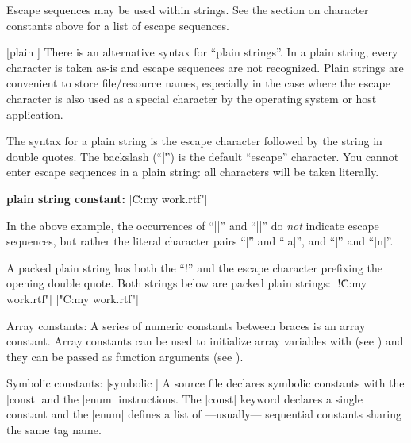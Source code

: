         Escape sequences may be used within strings. See the section on
        character constants above for a list of escape sequences.

         [plain \midtilde]
        There is an alternative syntax for ``plain strings''. In a plain string,
        every character is taken as-is and escape sequences are not recognized.
        Plain strings are convenient to store file\slash resource names, especially
        in the case where the escape character is also used as a special character
        by the operating system or host application.

        The syntax for a plain string is the escape character followed by the
        string in double quotes. The backslash (``|\|'') is the default
        ``escape'' character. You cannot enter escape sequences in a plain string:
        all characters will be taken literally.

        {\bf plain string constant:} \lbreak
        \tabto 20pt |\"C:\all my work\novel.rtf"|

        In the above example, the occurrences of ``|\a|'' and ``|\n|'' do {\it not\/}
        indicate escape sequences, but rather the literal character pairs ``|\|'' and
        ``|a|'', and ``|\|'' and ``|n|''.

        A packed plain string has both the ``!'' and the escape character prefixing
        the opening double quote. Both strings below are packed plain strings: \lbreak
        \tabto 20pt |!\"C:\all my work\novel.rtf"| \lbreak
        \tabto 20pt |\!"C:\all my work\novel.rtf"|

    \item Array constants: 
        A series of numeric constants between braces is an array constant.
        Array constants can be used to initialize array variables with (see
        ) and they can be passed as function
        arguments (see ).

    \endlist

\item Symbolic constants:
     [symbolic \midtilde]
    A source file declares symbolic constants with the |const|
    and the |enum| instructions.
    The |const| keyword declares a single constant and the |enum| defines a
    list of ---usually--- sequential constants sharing the same tag name.


